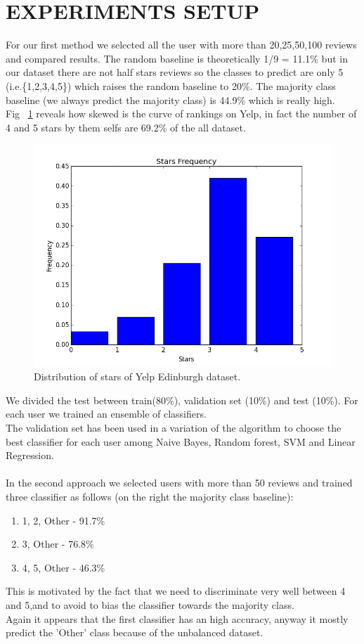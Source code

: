 \documentclass[11pt]{article}
\begin{document}
\section{EXPERIMENTS SETUP}
For our first method we selected all the user with more than 20,25,50,100 reviews and compared results. The random baseline is theoretically 1/9 = 11.1\% but in our dataset there are not half stars reviews so the classes to predict are only 5 (i.e.\{1,2,3,4,5\}) which raises the random baseline to 20\%.  The majority class baseline (we always predict the majority class) is 44.9\% which is really high.\\
Fig ~\ref{histStars} reveals how skewed is the curve of rankings on Yelp, in fact the number of 4 and 5 stars by them selfs are 69.2\% of the all dataset.
\begin{figure}[thpb]
	\centering
	\includegraphics[scale=0.4]{img/starsFrequency.png}
	\caption{Distribution of stars of Yelp Edinburgh dataset.}
	\label{histStars}
\end{figure}
We divided the test between train(80\%), validation set (10\%) and test (10\%).
For each user we trained an ensemble of classifiers.\\
The validation set has been used in a variation of the algorithm to choose the best classifier for each user among Naive Bayes, Random forest, SVM and Linear Regression.\\\\
In the second approach we selected users with more than 50 reviews and trained three classifier as follows (on the right the majority class baseline):
\begin{enumerate}
	\item 1, 2, Other - 91.7\%
	\item 3, Other - 76.8\%
	\item 4, 5, Other - 46.3\%
\end{enumerate}
This is motivated by the fact that we need to discriminate very well between 4 and 5,and to avoid to bias the classifier towards the majority class.\\
Again it appears that the first classifier has an high accuracy, anyway it mostly predict the 'Other' class because of the unbalanced dataset.\\
\end{document}
